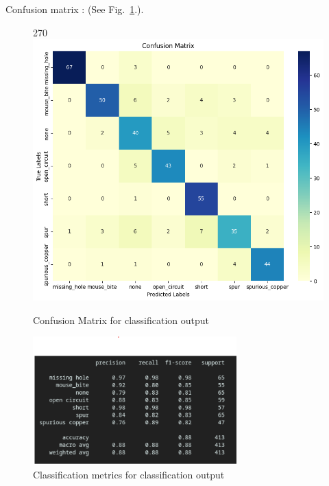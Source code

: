 \documentclass[12pt]{article}
\begin{document}
Confusion matrix : (See Fig.~\ref{fig:confusion_unet}.).
\begin{figure}[p]
    \centering
    \begin{turn}{270}  \includegraphics[width=0.7\paperwidth,height=0.7\paperheight,keepaspectratio]{./graphics/confusionmatrix_unet.png}
    \end{turn}
    \caption{Confusion Matrix for classification output}
    \label{fig:confusion_unet}
\end{figure}
\restoregeometry
\begin{figure}[H]
    \centering
    \includegraphics[width=0.7\textwidth]{./graphics/classification_report_unet.png}
    \caption{Classification metrics for classification output}
    \label{fig:classification_report_unet}
\end{figure}
\end{document}
